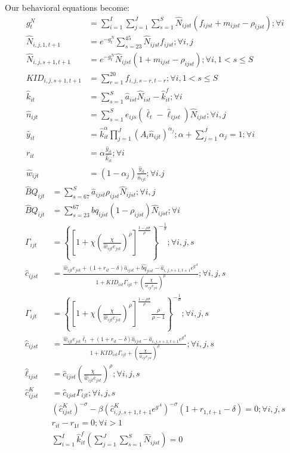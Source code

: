 \documentclass[letterpaper,12pt]{article}
\theoremstyle{definition}
\numberwithin{equation}{section}
\begin{document}
\begin{spacing}{1.5}
	Our behavioral equations become:
	\begin{align}
		g^N_t & = \sum_{i=1}^I \sum_{j=1}^J \sum_{s=1}^S \hat N_{ijst} (f_{ijst}+m_{ijst}-\rho_{ijst}) ; \forall i\\
		\hat N_{i,j,1,t+1} & = e^{-g^N_t}\sum_{s=23}^{45} \hat N_{ijst} f_{ijst} ; \forall i,j\\
		\hat N_{i,j,s+1,t+1} & = e^{-g^N_t}\hat N_{ijst} (1+m_{ijst}-\rho_{ijst}); \forall i, 1<s\le S \\
		KID_{i,j,s+1,t+1} & = \sum_{r=1}^{20} f_{i,j,s-r,t-r}; \forall i, 1<s\le S \\
		\hat k_{it} & = \sum_{s=1}^S \hat a_{ist} \hat N_{ist} - \hat k_{it}^f; \forall i \\
		\hat n_{ijt} & = \sum_{s=1}^S e_{ijs} (\bar \ell_t - \hat \ell_{ijst} ) \hat N_{ijst}; \forall i,j \\
		\hat y_{it} & = \hat k_{it}^\alpha \prod_{j=1}^J \left( A_{i} \hat n_{ijt} \right)^{\alpha_j}; \alpha + \sum_{j=1}^J \alpha_j = 1 ; \forall i \\
		r_{it} & = \alpha \frac{\hat y_{it}}{\hat k_{it}}; \forall i \\
		\hat w_{ijt} & = (1-\alpha_j) \frac{\hat y_{it}}{\hat n_{ijt}}; \forall i.j
	\end{align}
	\begin{align}
		\hat BQ_{ijt} & = \sum_{s=67}^S \hat a_{ijst} \rho_{ijst} \hat N_{ijst} ; \forall i,j \\
		\hat BQ_{ijt} & = \sum_{s=23}^{67} \hat bq_{ijst} (1-\rho_{ijst}) \hat N_{ijst}	; \forall i \\
		\Gamma_{ijt} & = \left\{ \left[1 + \chi \left(\frac{\chi}{\hat w_{ijt} e_{jst}}\right)^\rho\right]^{\tfrac{1-\rho \sigma}{\rho}} \right\}^{-\tfrac{1}{\sigma}}; \forall i,j,s \\
    	\hat c_{ijst} & = \frac{\hat w_{ijt} e_{jst} + (1+r_{it}-\delta)\hat a_{ijst} + \hat{bq}_{jist} - \hat a_{i,j,s+1,t+1} e^{g^A}} {1 + KID_{ist}\Gamma_{ijt} + \left(\tfrac{\chi}{\hat w_{ijt}e_{jst}}\right)^\rho}; \forall i,j,s \\
		\Gamma_{ijt} & = \left\{ \left[1 + \chi \left(\frac{\chi}{\hat w_{ijt} e_{jst}}\right)^\rho\right]^{\tfrac{1-\rho \sigma}{\rho}} \frac{\rho}{\rho-1} \right\}^{-\tfrac{1}{\sigma}}; \forall i,j,s \\
    	\hat c_{ijst} & = \frac{\hat w_{ijt} e_{jst} \bar \ell_t + (1+r_{it}-\delta)\hat a_{ijst} - \hat a_{i,j,s+1,t+1} e^{g^A}} {1 + KID_{ist}\Gamma_{ijt} + \left(\tfrac{\chi}{\hat w_{ijt}e_{jst}}\right)^\rho}; \forall i,j,s \\
		\hat \ell_{ijst} & = \hat c_{ijst} \left(\frac{\chi}{\hat w_{ijt}e_{jst}}\right)^\rho ; \forall i,j,s \\
		\hat c^K_{ijst} & = \hat c_{ijst} \Gamma_{ijt}; \forall i,j,s \\
		& \left({\hat c^K_{ijst}}\right)^{-\sigma} - \beta \left(\hat c^K_{i,j,s+1,t+1} e^{g^A}\right)^{-\sigma}(1+r_{1,t+1}-\delta) = 0; \forall i,j,s \\
		& r_{it} - r_{1t} = 0; \forall i>1 \\
		& \sum_{i=1}^I \hat k^f_{it} \left( \sum_{j=1}^J \sum_{s=1}^S \hat N_{ijst} \right) = 0
	\end{align}



\end{spacing}
\end{document}
